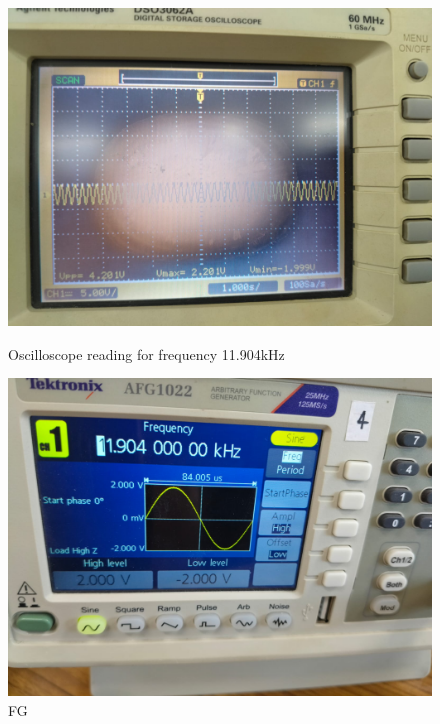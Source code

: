 \documentclass[a4paper,12pt]{article}
\begin{document}
\begin{figure}[H]
    \centering
    \begin{minipage}[b]{0.45\textwidth}
        \centering
        \includegraphics[width=\textwidth]{fig/hp/11ko.jpeg}
        \caption{Oscilloscope reading for frequency 11.904kHz}
    \end{minipage}
    \hfill
    \begin{minipage}[b]{0.45\textwidth}
        \centering
        \includegraphics[width=\textwidth]{fig/hp/11k.jpeg}
        \caption{FG}
    \end{minipage}
\end{figure}
\end{document}
